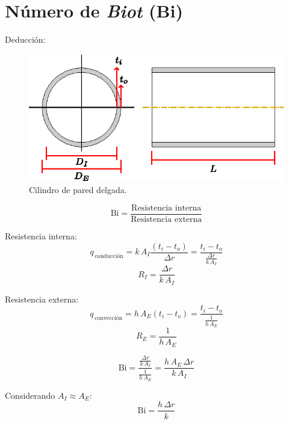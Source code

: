 \section{Número de \emph{Biot} (Bi)}
Deducción:
\begin{figure}[!h]
\centering
\includegraphics[scale=1.25]{figura03_03.eps}
\caption{Cilindro de pared delgada.}
\end{figure}

\begin{equation*}
    \text{Bi} = \frac{\text{Resistencia interna}}{\text{Resistencia externa}}
\end{equation*}

Resistencia interna:
\begin{equation*}
    q_{\,\text{conducción}} = k\,A_I\frac{(t_i-t_o)}{\Delta r}
                            = \frac{t_i-t_o}{\frac{\Delta r}{k\,A_I}}
\end{equation*}
\begin{equation*}
    R_I = \frac{\Delta r}{k\,A_I}
\end{equation*}

Resistencia externa:
\begin{equation*}
    q_{\,\text{convección}} = h\,A_E(t_i-t_o)
                            = \frac{t_i-t_o}{\frac{1}{h\,A_E}}
\end{equation*}
\begin{equation*}
    R_E = \frac{1}{h\,A_E}
\end{equation*}

\begin{equation*}
    \text{Bi} = \frac{\frac{\Delta r}{k\,A_I}}{\frac{1}{h\,A_E}}
              = \frac{h\,A_E\,\Delta r}{k\,A_I}
\end{equation*}

Considerando $A_I\approx A_E$:
\begin{equation*}
    \text{Bi} = \frac{h\,\Delta r}{k}
\end{equation*}

